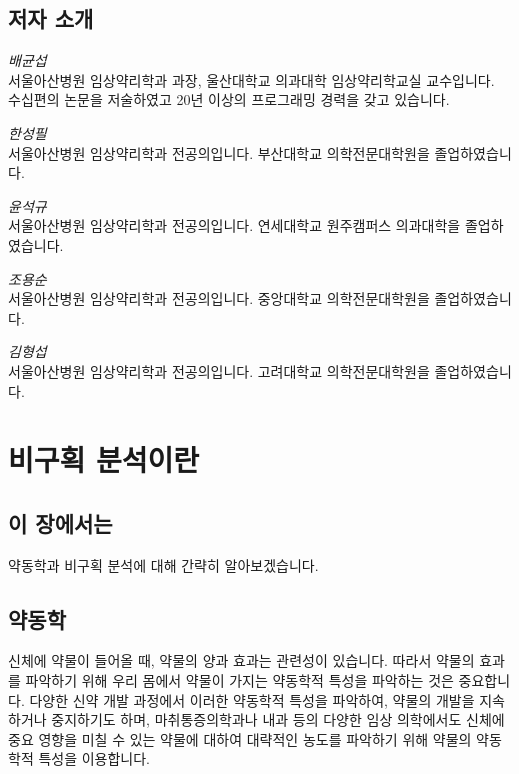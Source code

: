 \documentclass[12pt,]{krantz}
\theoremstyle{definition}
\theoremstyle{definition}
\theoremstyle{definition}
\theoremstyle{remark}
\begin{document}
\section*{저자 소개}\label{-}


\emph{배균섭}\\
서울아산병원 임상약리학과 과장, 울산대학교 의과대학 임상약리학교실
교수입니다. 수십편의 논문을 저술하였고 20년 이상의 프로그래밍 경력을
갖고 있습니다.

\emph{한성필}\\
서울아산병원 임상약리학과 전공의입니다. 부산대학교 의학전문대학원을
졸업하였습니다.

\emph{윤석규}\\
서울아산병원 임상약리학과 전공의입니다. 연세대학교 원주캠퍼스 의과대학을
졸업하였습니다.

\emph{조용순}\\
서울아산병원 임상약리학과 전공의입니다. 중앙대학교 의학전문대학원을
졸업하였습니다.

\emph{김형섭}\\
서울아산병원 임상약리학과 전공의입니다. 고려대학교 의학전문대학원을
졸업하였습니다.

\mainmatter

\chapter{비구획 분석이란}\label{introduction}

\section{이 장에서는}\label{summary-introduction}

약동학과 비구획 분석에 대해 간략히 알아보겠습니다.

\section{약동학}\label{PK-introduction}

신체에 약물이 들어올 때, 약물의 양과 효과는 관련성이 있습니다. 따라서
약물의 효과를 파악하기 위해 우리 몸에서 약물이 가지는 약동학적 특성을
파악하는 것은 중요합니다. 다양한 신약 개발 과정에서 이러한 약동학적
특성을 파악하여, 약물의 개발을 지속하거나 중지하기도 하며,
마취통증의학과나 내과 등의 다양한 임상 의학에서도 신체에 중요 영향을
미칠 수 있는 약물에 대하여 대략적인 농도를 파악하기 위해 약물의 약동학적
특성을 이용합니다.
\end{document}
